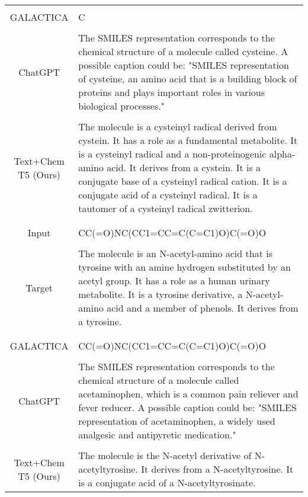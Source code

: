 \documentclass[nohyperref]{article}
\theoremstyle{plain}
\theoremstyle{definition}
\theoremstyle{remark}
\begin{document}
\begin{table}[h!]
{\begin{tabular}{c | p{12cm} }
\hdashline\\
GALACTICA &  C  \\\\
ChatGPT & The SMILES representation corresponds to the chemical structure of a molecule called cysteine. A possible caption could be: "SMILES representation of cysteine, an amino acid that is a building block of proteins and plays important roles in various biological processes." 
\\\\
Text+Chem T5 (Ours) & 
The molecule is a cysteinyl radical derived from cystein. It has a role as a fundamental metabolite. It is a cysteinyl radical and a non-proteinogenic alpha-amino acid. It derives from a cystein. It is a conjugate base of a cysteinyl radical cation. It is a conjugate acid of a cysteinyl radical. It is a tautomer of a cysteinyl radical zwitterion.
 \\\\
 &  \\
\toprule
Input  & CC(=O)NC(CC1=CC=C(C=C1)O)C(=O)O \\\\
Target &  
The molecule is an N-acetyl-amino acid that is tyrosine with an amine hydrogen substituted by an acetyl group. It has a role as a human urinary metabolite. It is a tyrosine derivative, a N-acetyl-amino acid and a member of phenols. It derives from a tyrosine.
\\\\
\hdashline\\
GALACTICA & CC(=O)NC(CC1=CC=C(C=C1)O)C(=O)O \\\\
ChatGPT  &
The SMILES representation corresponds to the chemical structure of a molecule called acetaminophen, which is a common pain reliever and fever reducer. A possible caption could be: "SMILES representation of acetaminophen, a widely used analgesic and antipyretic medication."
\\\\
Text+Chem T5 (Ours) & 
The molecule is the N-acetyl derivative of N-acetyltyrosine. It derives from a N-acetyltyrosine. It is a conjugate acid of a N-acetyltyrosinate.
\label{app:example-m2d}
\end{tabular}
}
\end{table}
\end{document}
